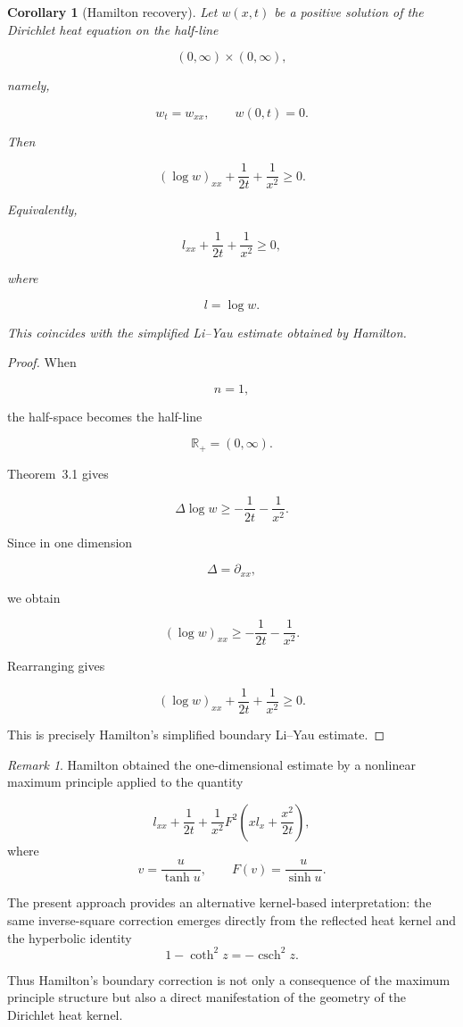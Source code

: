 \documentclass[11pt]{amsart}
\DeclareMathOperator{\csch}{csch}
\newtheorem{corollary}[theorem]{Corollary}
\theoremstyle{definition}
\theoremstyle{remark}
\newtheorem{remark}[theorem]{Remark}
\begin{document}
\begin{corollary}[Hamilton recovery]

Let $w(x,t)$ be a positive solution of the Dirichlet heat equation
on the half-line

\[
(0,\infty)\times(0,\infty),
\]

namely,

\[
w_t=w_{xx},
\qquad
w(0,t)=0 .
\]


Then

\[
(\log w)_{xx}
+
\frac1{2t}
+
\frac1{x^2}
\geq0 .
\]

Equivalently,

\[
\boxed{
l_{xx}
+
\frac1{2t}
+
\frac1{x^2}
\geq0 ,
}
\]

where

\[
l=\log w .
\]

This coincides with the simplified Li--Yau estimate obtained by
Hamilton.

\end{corollary}



\begin{proof}


When

\[
n=1,
\]

the half-space becomes the half-line

\[
\mathbb R_+=(0,\infty).
\]

Theorem~3.1 gives

\[
\Delta\log w
\geq
-\frac1{2t}
-\frac1{x^2}.
\]

Since in one dimension

\[
\Delta=\partial_{xx},
\]

we obtain

\[
(\log w)_{xx}
\geq
-\frac1{2t}
-\frac1{x^2}.
\]

Rearranging gives

\[
(\log w)_{xx}
+
\frac1{2t}
+
\frac1{x^2}
\geq0 .
\]

This is precisely Hamilton's simplified boundary Li--Yau
estimate.

\end{proof}



\begin{remark}

Hamilton obtained the one-dimensional estimate by a nonlinear
maximum principle applied to the quantity

\[
l_{xx}
+\frac1{2t}
+\frac1{x^2}F^2
\left(
xl_x+\frac{x^2}{2t}
\right),
\]
where
\[
v=\frac{u}{\tanh u},
\qquad
F(v)=\frac{u}{\sinh u}.
\]

The present approach provides an alternative kernel-based
interpretation: the same inverse-square correction emerges
directly from the reflected heat kernel and the hyperbolic identity
\[
1-\coth^2 z=-\csch^2z .
\]

Thus Hamilton's boundary correction is not only a consequence of
the maximum principle structure but also a direct manifestation of
the geometry of the Dirichlet heat kernel.

\end{remark}
\end{document}
